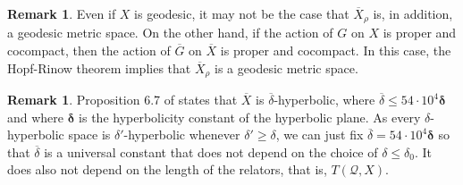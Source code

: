 \documentclass[leqno,a4paper,10pt]{amsart}
\theoremstyle{plain}
\theoremstyle{definition}
\newtheorem{rem}[thm]{Remark}
\theoremstyle{remark}
\newcommand{\scrQ}{\mathscr{Q}}
\begin{document}
\begin{rem} Even if $X$ is geodesic, it may not be the case that $\overline X_\rho$ is, in addition, a geodesic metric space. On the other hand, if the action of $G$ on $X$ is proper and cocompact, then the action of $\overline G$ on $\overline X$ is proper and cocompact. In this case, the Hopf-Rinow theorem implies that $\overline X_\rho$ is a geodesic metric space. 
\end{rem}

\begin{rem}\label{R:deltabar-universal-constant} Proposition 6.7 of \cite{coulon_geometry_2014} states that $\overline X$ is $\overline \delta$-hyperbolic, where $\overline \delta \leqslant 54\cdot 10^4 \bm{\delta}$ and  where $\bm{\delta}$ is the hyperbolicity constant of the hyperbolic plane. As every $\delta$-hyperbolic space is $\delta'$-hyperbolic whenever $\delta'\geqslant\delta$, we can just fix $\overline \delta =54\cdot 10^4 \bm{\delta}$ so that $\overline \delta$ is a universal constant that does not depend on the choice of $\delta \leqslant \delta_0$.  It does also not depend on the length of the relators, that is, $T(\scrQ,X)$.
\end{rem}
\end{document}
